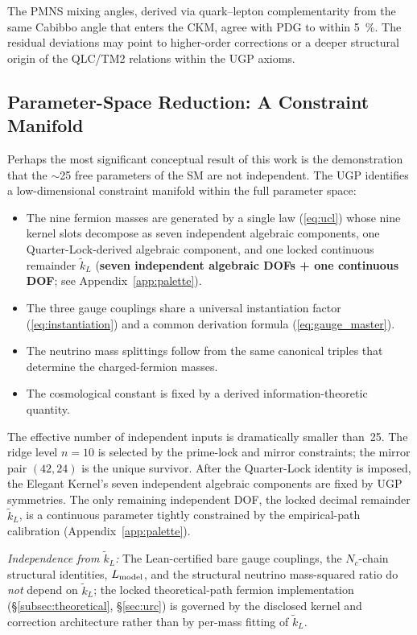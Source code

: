 \documentclass[11pt]{article}
\theoremstyle{remark}
\begin{document}
The PMNS mixing angles, derived via quark--lepton complementarity from the same Cabibbo angle that enters the CKM, agree with PDG to within \SI{5}{\percent}.
The residual deviations may point to higher-order corrections or a deeper structural origin of the QLC/TM2 relations within the UGP axioms.

\subsection{Parameter-Space Reduction: A Constraint Manifold}
\label{subsec:manifold}

Perhaps the most significant conceptual result of this work is the demonstration that the $\sim$25 free parameters of the SM are not independent.
The UGP identifies a low-dimensional constraint manifold within the full parameter space:
\begin{itemize}[leftmargin=1.4em,itemsep=0.1em,topsep=0.2em]
  \item The nine fermion masses are generated by a single law (\cref{eq:ucl}) whose nine kernel slots decompose as seven independent algebraic components, one Quarter-Lock-derived algebraic component, and one locked continuous remainder $\tilde{k}_L$ (\textbf{seven independent algebraic DOFs + one continuous DOF}; see Appendix~\ref{app:palette}).
  \item The three gauge couplings share a universal instantiation factor (\cref{eq:instantiation}) and a common derivation formula (\cref{eq:gauge_master}).
  \item The neutrino mass splittings follow from the same canonical triples that determine the charged-fermion masses.
  \item The cosmological constant is fixed by a derived information-theoretic quantity.
\end{itemize}

The effective number of independent inputs is dramatically smaller than~25.
The ridge level $n{=}10$ is selected by the prime-lock and mirror constraints; the mirror pair $(42,24)$ is the unique survivor.
After the Quarter-Lock identity is imposed, the Elegant Kernel's seven independent algebraic components are fixed by UGP symmetries.
The only remaining independent DOF, the locked decimal remainder $\tilde{k}_L$, is a continuous parameter tightly constrained by the empirical-path calibration (Appendix~\ref{app:palette}).

\smallskip
\noindent\emph{Independence from $\tilde{k}_L$:} The Lean-certified bare gauge couplings, the $N_c$-chain structural identities, $L_{\rm model}$, and the structural neutrino mass-squared ratio do \emph{not} depend on $\tilde{k}_L$; the locked theoretical-path fermion implementation (\S\ref{subsec:theoretical}, \S\ref{sec:urc}) is governed by the disclosed kernel and correction architecture rather than by per-mass fitting of $\tilde{k}_L$.
\end{document}
